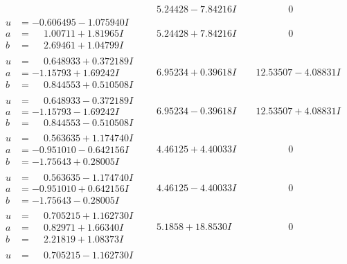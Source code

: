 \documentclass[1p]{elsarticle_modified}
\theoremstyle{definition}
\begin{document}
$$\begin{array}{c|c|c}
 & \phantom{-}5.24428 - 7.84216 I & \phantom{-0.000000 } 0 \\ \hline\begin{aligned}
u &= -0.606495 - 1.075940 I \\
a &= \phantom{-}1.00711 + 1.81965 I \\
b &= \phantom{-}2.69461 + 1.04799 I\end{aligned}
 & \phantom{-}5.24428 + 7.84216 I & \phantom{-0.000000 } 0 \\ \hline\begin{aligned}
u &= \phantom{-}0.648933 + 0.372189 I \\
a &= -1.15793 + 1.69242 I \\
b &= \phantom{-}0.844553 + 0.510508 I\end{aligned}
 & \phantom{-}6.95234 + 0.39618 I & \phantom{-}12.53507 - 4.08831 I \\ \hline\begin{aligned}
u &= \phantom{-}0.648933 - 0.372189 I \\
a &= -1.15793 - 1.69242 I \\
b &= \phantom{-}0.844553 - 0.510508 I\end{aligned}
 & \phantom{-}6.95234 - 0.39618 I & \phantom{-}12.53507 + 4.08831 I \\ \hline\begin{aligned}
u &= \phantom{-}0.563635 + 1.174740 I \\
a &= -0.951010 - 0.642156 I \\
b &= -1.75643 + 0.28005 I\end{aligned}
 & \phantom{-}4.46125 + 4.40033 I & \phantom{-0.000000 } 0 \\ \hline\begin{aligned}
u &= \phantom{-}0.563635 - 1.174740 I \\
a &= -0.951010 + 0.642156 I \\
b &= -1.75643 - 0.28005 I\end{aligned}
 & \phantom{-}4.46125 - 4.40033 I & \phantom{-0.000000 } 0 \\ \hline\begin{aligned}
u &= \phantom{-}0.705215 + 1.162730 I \\
a &= \phantom{-}0.82971 + 1.66340 I \\
b &= \phantom{-}2.21819 + 1.08373 I\end{aligned}
 & \phantom{-}5.1858 + 18.8530 I & \phantom{-0.000000 } 0 \\ \hline\begin{aligned}
u &= \phantom{-}0.705215 - 1.162730 I \\

\end{aligned}
\end{array}$$
\end{document}
